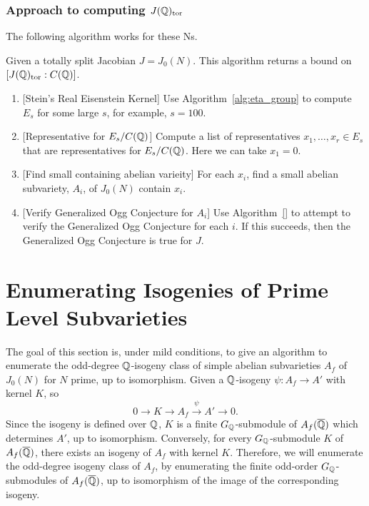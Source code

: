 \documentclass[11pt, proquest]{uwthesis}
\begin{document}
\subsection{Approach to computing $J(\mathbb{Q})_{\mathrm{tor}}$}%
\label{sub:approach_to_computing_j_qq__tor_}

The following algorithm works for these Ns.
\begin{algorithm}
    Given a totally split Jacobian $J=J_0(N)$. This algorithm returns a bound on
    $[J(\mathbb{Q})_{\mathrm{tor}}:C(\mathbb{Q})]$.
    \begin{enumerate}
        \item{} [Stein's Real Eisenstein Kernel]
            Use Algorithm~\ref{alg:eta_group} to compute $E_s$ for some large
            $s$, for example, $s=100$.
        \item{} [Representative for $E_s/C(\mathbb{Q})$]
            Compute a list of representatives $x_1,\ldots,x_r\in E_s$ that are
            representatives for $E_s/C(\mathbb{Q})$. Here we can take $x_1=0$.
        \item{} [Find small containing abelian varieity]
            For each $x_i$, find a small abelian subvariety, $A_i$, of $J_0(N)$
            contain $x_i$.
        \item{} [Verify Generalized Ogg Conjecture for $A_i$]
            Use Algorithm~\ref{} to attempt to verify the Generalized Ogg
            Conjecture for each $i$. If this succeeds, then the Generalized Ogg
            Conjecture is true for $J$.
    \end{enumerate}
\end{algorithm}



\chapter{Enumerating Isogenies of Prime Level Subvarieties}%
\label{chap:isogeny_class}

The goal of this section is, under mild conditions, to give an algorithm to
enumerate the odd-degree $\mathbb{Q}$-isogeny class of simple abelian subvarieties
$A_f$ of $J_0(N)$ for $N$ prime, up to isomorphism. Given a $\mathbb{Q}$-isogeny
$\psi:A_f\to A'$ with kernel $K$, so
\[
    0 \to K \to A_f \overset{\psi}{\to} A' \to 0.
\]
Since the isogeny is defined over $\mathbb{Q}$, $K$ is a finite $G_{\mathbb{Q}}$-submodule of
$A_f(\overline{\mathbb{Q}})$ which determines $A'$, up to isomorphism. Conversely, for every
$G_{\mathbb{Q}}$-submodule $K$ of $A_f(\overline{\mathbb{Q}})$, there exists an isogeny of $A_f$ with
kernel $K$. Therefore, we will enumerate the odd-degree isogeny class of $A_f$,
by enumerating the finite odd-order $G_{\mathbb{Q}}$-submodules of $A_f(\overline{\mathbb{Q}})$, up to
isomorphism of the image of the corresponding isogeny. 
\end{document}
